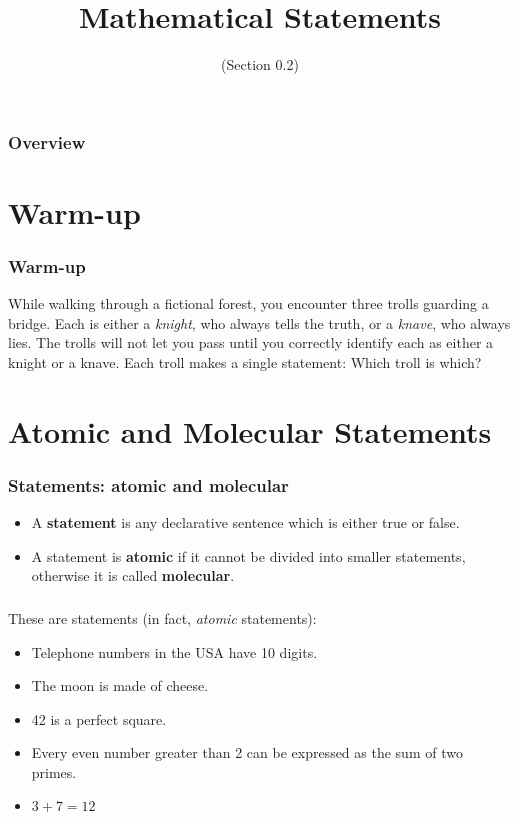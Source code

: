 \documentclass[11pt, compress]{beamer}
\title{Mathematical Statements}
\subtitle{(Section 0.2)}
\newcommand{\terminology}[1]{\textbf{#1}}\newcommand{\lt}{<}
\begin{document}
\begin{frame}
\maketitle 
\end{frame}
 
\begin{frame}
\frametitle{Overview}
\tableofcontents 
\end{frame}
 

\section{Warm-up}
\begin{frame}
\frametitle{Warm-up}
 While walking through a fictional forest, you encounter three trolls guarding a bridge. Each is either a \emph{knight}, who always tells the truth, or a \emph{knave}, who always lies. The trolls will not let you pass until you correctly identify each as either a knight or a knave. Each troll makes a single statement:
 Which troll is which?
\end{frame}
 


\section{Atomic and Molecular Statements}
\begin{frame}
\frametitle{Statements: atomic and molecular}
 \begin{itemize}
\item{} A \terminology{statement} is any declarative sentence which is either true or false.


\item{} A statement is \terminology{atomic} if it cannot be divided into smaller statements, otherwise it is called \terminology{molecular}.

\end{itemize}

\end{frame}
 
\begin{frame}
\frametitle{}
\begin{example}[0.2.1]These are statements (in fact, \emph{atomic} statements):\begin{itemize}
\item{} Telephone numbers in the USA have 10 digits.


\item{} The moon is made of cheese.


\item{} 42 is a perfect square.


\item{} Every even number greater than 2 can be expressed as the sum of two primes.


\item{} \(3+7 = 12\)

\end{itemize}

\end{example}
\end{frame}
 
\end{document}
